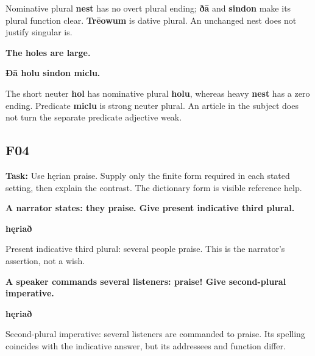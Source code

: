 Nominative plural \textbf{nest} has no overt plural ending; \textbf{ðā} and \textbf{sindon} make its plural function clear. \textbf{Trēowum} is dative plural. An unchanged nest does not justify singular is.

\textbf{The holes are large.}

\textbf{Ðā holu sindon miclu.}

The short neuter \textbf{hol} has nominative plural \textbf{holu}, whereas heavy \textbf{nest} has a zero ending. Predicate \textbf{miclu} is strong neuter plural. An article in the subject does not turn the separate predicate adjective weak.

\subsection*{F04}

\textbf{Task:} Use hęrian praise. Supply only the finite form required in each stated setting, then explain the contrast. The dictionary form is visible reference help.

\textbf{A narrator states: they praise. Give present indicative third plural.}

\textbf{hęriað}

Present indicative third plural: several people praise. This is the narrator's assertion, not a wish.

\textbf{A speaker commands several listeners: praise! Give second-plural imperative.}

\textbf{hęriað}

Second-plural imperative: several listeners are commanded to praise. Its spelling coincides with the indicative answer, but its addressees and function differ.

